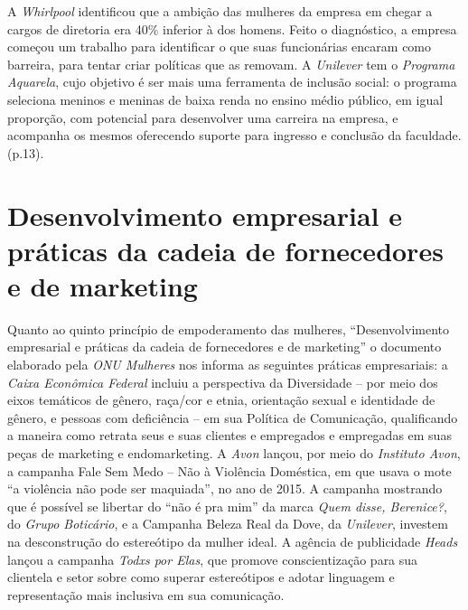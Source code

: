 A \emph{Whirlpool} identificou que a ambição das mulheres da empresa em
chegar a cargos de diretoria era 40\% inferior à dos homens. Feito o
diagnóstico, a empresa começou um trabalho para identificar o que suas
funcionárias encaram como barreira, para tentar criar políticas que as
removam. A \emph{Unilever} tem o \emph{Programa Aquarela}, cujo objetivo
é ser mais uma ferramenta de inclusão social: o programa seleciona
meninos e meninas de baixa renda no ensino médio público, em igual
proporção, com potencial para desenvolver uma carreira na empresa, e
acompanha os mesmos oferecendo suporte para ingresso e conclusão da
faculdade. (p.13).

\section{Desenvolvimento empresarial e práticas da cadeia de fornecedores e de marketing}

Quanto ao quinto princípio de empoderamento das mulheres,
``Desenvolvimento empresarial e práticas da cadeia de fornecedores e de
marketing'' o documento elaborado pela \emph{ONU Mulheres} nos informa
as seguintes práticas empresariais: a \emph{Caixa Econômica Federal}
incluiu a perspectiva da Diversidade -- por meio dos eixos temáticos de
gênero, raça/cor e etnia, orientação sexual e identidade de gênero, e
pessoas com deficiência -- em sua Política de Comunicação, qualificando
a maneira como retrata seus e suas clientes e empregados e empregadas em
suas peças de marketing e endomarketing. A \emph{Avon} lançou, por meio
do \emph{Instituto Avon}, a campanha Fale Sem Medo -- Não à Violência
Doméstica, em que usava o mote ``a violência não pode ser maquiada'', no
ano de 2015. A campanha mostrando que é possível se libertar do ``não é
pra mim'' da marca \emph{Quem disse, Berenice?}, do \emph{Grupo
Boticário}, e a Campanha Beleza Real da Dove, da \emph{Unilever},
investem na desconstrução do estereótipo da mulher ideal. A agência de
publicidade \emph{Heads} lançou a campanha \emph{Todxs por Elas}, que
promove conscientização para sua clientela e setor sobre como superar
estereótipos e adotar linguagem e representação mais inclusiva em sua
comunicação.

